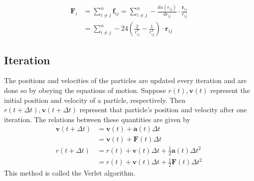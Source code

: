 \documentclass[10pt,a4paper,notitlepage]{article}
\begin{document}
  \begin{align}\label{F_i}
  \textbf{F}_i &= \displaystyle\sum^n_{i\neq j} \textbf{f}_{ij} = \displaystyle\sum^n_{i\neq j} - \frac{du(r_{ij})}{dr_{ij}} \cdot \frac{\textbf{r}_{ij}}{r_{ij}}\nonumber\\
   &=\displaystyle\sum^n_{i\neq j} -24\left(  \frac{2}{r^7_{ij}}-\frac{1}{r^4_{ij}}\right) \cdot \textbf{r}_{ij}
  \end{align}

\subsection{Iteration}
The positions and velocities of the particles are updated every iteration and are done so by obeying the equations of motion. Suppose $r(t),\textbf{v}(t)$ represent the initial position and velocity of a particle, respectively. Then $r(t+\Delta t),\textbf{v}(t+\Delta t)$ represent that particle's position and velocity after one iteration. The relations between these quantities are given by
\begin{align}
\textbf{v}(t+\Delta t) &= \textbf{v}(t) + \textbf{a}(t)\Delta t\nonumber\\
                       &= \textbf{v}(t) + \textbf{F}(t)\Delta t\\\label{v_iter}
r(t+\Delta t)          &= r(t) + \textbf{v}(t)\Delta t + \frac{1}{2}\textbf{a}(t)\Delta t^2\nonumber\\
                       &= r(t) + \textbf{v}(t)\Delta t + \frac{1}{2}\textbf{F}(t)\Delta t^2 
\end{align}
This method is called the Verlet algorithm.
\end{document}
